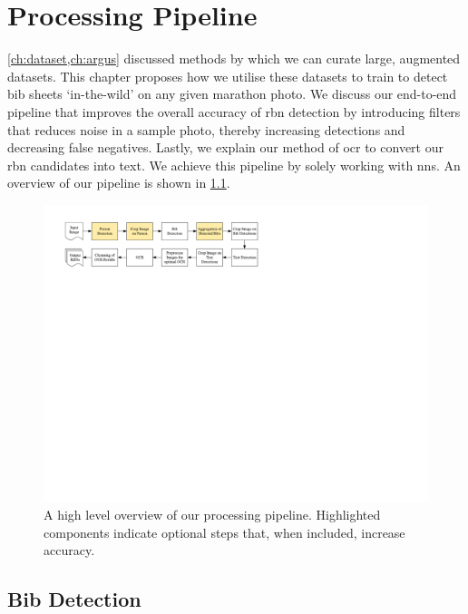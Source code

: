 \chapter{Processing Pipeline}
\label{ch:processing_pipeline}

\cref{ch:dataset,ch:argus} discussed methods by which we can curate large, augmented datasets. This chapter proposes how we utilise these datasets to train  to detect bib sheets `in-the-wild' on any given marathon photo. We discuss our end-to-end pipeline that improves the overall accuracy of \gls{rbn} detection by introducing filters that reduces noise in a sample photo, thereby increasing detections and decreasing false negatives. Lastly, we explain our method of \gls{ocr} to convert our \gls{rbn} candidates into text. We achieve this pipeline by solely working with \glspl{nn}. An overview of our pipeline is shown in \cref{fig:processing_pipeline:pipeline}.

\bigskip
\begin{figure}[h]
  \centering
  \includegraphics[width=\textwidth]{images/processing/pipeline}
  \caption[Overview of our processing pipeline]{A high level overview of our processing pipeline. Highlighted components indicate optional steps that, when included, increase accuracy.}
  \label{fig:processing_pipeline:pipeline}
\end{figure}

\section{Bib Detection}
\label{sec:processing_pipeline:pipeline}

